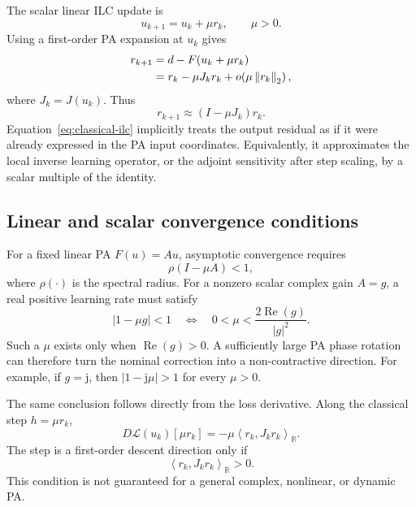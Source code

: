 \documentclass[10pt,a4paper]{article}
\newcommand{\Rinner}[2]{\left\langle #1,#2\right\rangle_{\mathbb R}}
\newcommand{\norm}[1]{\left\lVert #1\right\rVert_2}
\begin{document}
The scalar linear ILC update is
\begin{equation}
  u_{k+1}=u_k+\mu r_k,
  \qquad \mu>0.
  \label{eq:classical-ilc}
\end{equation}
Using a first-order PA expansion at $u_k$ gives
\begin{align}
  r_{k+1}
  &=d-F(u_k+\mu r_k) \notag\\
  &=r_k-\mu J_k r_k
    +o\!\left(\mu\norm{r_k}\right),
  \label{eq:local-residual-dynamics}
\end{align}
where $J_k=J(u_k)$. Thus
\begin{equation}
  r_{k+1}\approx (I-\mu J_k)r_k.
\end{equation}
Equation~\eqref{eq:classical-ilc} implicitly treats the output residual as if it were already expressed in
the PA input coordinates. Equivalently, it approximates the local inverse learning operator, or the
adjoint sensitivity after step scaling, by a scalar multiple of the identity.

\subsection{Linear and scalar convergence conditions}

For a fixed linear PA $F(u)=Au$, asymptotic convergence requires
\begin{equation}
  \rho(I-\mu A)<1,
  \label{eq:spectral-condition}
\end{equation}
where $\rho(\cdot)$ is the spectral radius. For a nonzero scalar complex gain $A=g$, a real positive learning rate
must satisfy
\begin{equation}
  |1-\mu g|<1
  \quad\Longleftrightarrow\quad
  0<\mu<\frac{2\operatorname{Re}(g)}{|g|^2}.
  \label{eq:complex-gain-condition}
\end{equation}
Such a $\mu$ exists only when $\operatorname{Re}(g)>0$. A sufficiently large PA phase rotation can therefore
turn the nominal correction into a non-contractive direction. For example, if $g=\mathrm j$, then
$|1-\mathrm j\mu|>1$ for every $\mu>0$.

The same conclusion follows directly from the loss derivative. Along the classical step $h=\mu r_k$,
\begin{equation}
  D\mathcal L(u_k)[\mu r_k]
  =-\mu\Rinner{r_k}{J_k r_k}.
  \label{eq:classical-descent-test}
\end{equation}
The step is a first-order descent direction only if
\begin{equation}
  \Rinner{r_k}{J_k r_k}>0.
  \label{eq:descent-condition}
\end{equation}
This condition is not guaranteed for a general complex, nonlinear, or dynamic PA.
\end{document}

